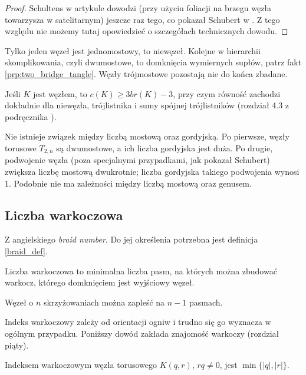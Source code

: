 \begin{proof}
    Schultens w artykule \cite{schultens03} dowodzi (przy użyciu foliacji na brzegu węzła towarzysza w satelitarnym) jeszcze raz tego, co pokazał Schubert w \cite{schubert54}.
    Z tego względu nie możemy tutaj opowiedzieć o szczegółach technicznych dowodu.
\end{proof}

Tylko jeden węzeł jest jednomostowy, to niewęzeł.
Kolejne w hierarchii skomplikowania, czyli dwumostowe,
to domknięcia wymiernych supłów, patrz fakt \ref{prp:two_bridge_tangle}.
Węzły trójmostowe pozostają nie do końca zbadane.

\begin{conjecture}
    Jeśli $K$ jest węzłem, to $c(K) \ge 3 br(K) - 3$, przy czym równość zachodzi dokładnie dla niewęzła, trójlistnika i sumy spójnej trójlistników (rozdział 4.3 z podręcznika \cite{murasugi96}).
\end{conjecture}

Nie istnieje związek między liczbą mostową oraz gordyjską.
Po pierwsze, węzły torusowe $T_{2,n}$ są dwumostowe, a ich liczba gordyjska jest duża.
Po drugie, podwojenie węzła (poza specjalnymi przypadkami, jak pokazał Schubert) zwiększa liczbę mostową dwukrotnie; liczba gordyjska takiego podwojenia wynosi $1$.
Podobnie nie ma zależności między liczbą mostową oraz genusem.


\subsection{Liczba warkoczowa} %
\label{sub:braid_number}
Z angielskiego \emph{braid number}.
Do jej określenia potrzebna jest definicja \ref{braid_def}.

\begin{definition}
    Liczba warkoczowa to minimalna liczba pasm, na których można zbudować warkocz, którego domknięciem jest wyjściowy węzeł.
\end{definition}

\begin{proposition}
    Węzeł o $n$ skrzyżowaniach można zapleść na $n - 1$ pasmach.
\end{proposition}

Indeks warkoczowy zależy od orientacji ogniw i trudno się go wyznacza w ogólnym przypadku.
Poniższy dowód zakłada znajomość warkoczy (rozdział piąty).

\begin{proposition}
    Indeksem warkoczowym węzła torusowego $K(q, r)$, $rq \neq 0$, jest $\min\{|q|, |r|\}$.
\end{proposition}


